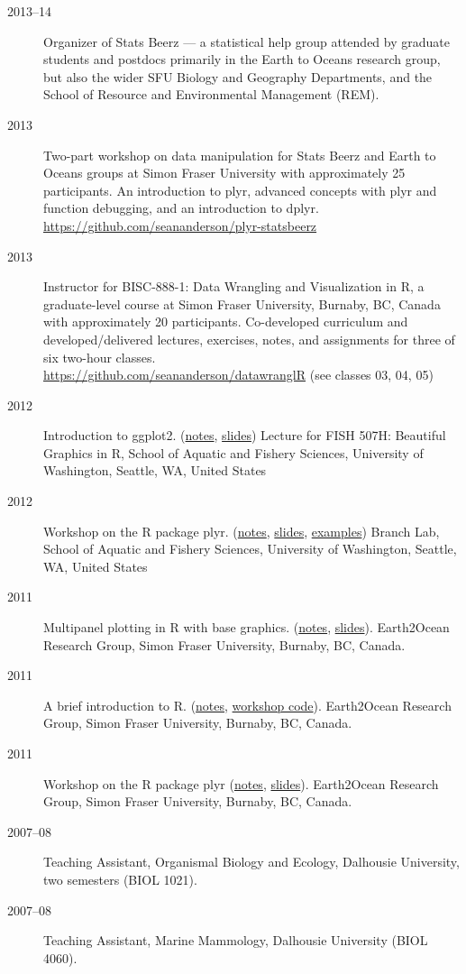 \begin{description}
\item[2013--14]
Organizer of Stats Beerz --- a statistical help group attended by
graduate students and postdocs primarily in the Earth to Oceans research
group, but also the wider SFU Biology and Geography Departments, and the
School of Resource and Environmental Management (REM).
\item[2013]
Two-part workshop on data manipulation for Stats Beerz and Earth to
Oceans groups at Simon Fraser University with approximately 25
participants. An introduction to plyr, advanced concepts with plyr and
function debugging, and an introduction to dplyr.\\
\url{https://github.com/seananderson/plyr-statsbeerz}
\item[2013]
Instructor for BISC-888-1: Data Wrangling and Visualization in R, a
graduate-level course at Simon Fraser University, Burnaby, BC, Canada
with approximately 20 participants. Co-developed curriculum and
developed/delivered lectures, exercises, notes, and assignments for
three of six two-hour classes.\\
\url{https://github.com/seananderson/datawranglR} (see classes 03, 04,
05)
\item[2012]
Introduction to ggplot2.
(\href{http://seananderson.ca/courses/12-ggplot2/ggplot2_notes.pdf}{notes},
\href{http://seananderson.ca/courses/12-ggplot2/ggplot2_slides_with_examples.pdf}{slides})
Lecture for FISH 507H: Beautiful Graphics in R, School of Aquatic and
Fishery Sciences, University of Washington, Seattle, WA, United States
\item[2012]
Workshop on the R package plyr.
(\href{http://seananderson.ca/courses/12-plyr/plyr_2012.pdf}{notes},
\href{http://seananderson.ca/courses/12-plyr/plyr_2012_slides.pdf}{slides},
\href{http://seananderson.ca/courses/12-plyr/plyr_2012_examples.html}{examples})
Branch Lab, School of Aquatic and Fishery Sciences, University of
Washington, Seattle, WA, United States
\item[2011]
Multipanel plotting in R with base graphics.
(\href{http://seananderson.ca/courses/11-multipanel/multipanel.pdf}{notes},
\href{http://seananderson.ca/courses/11-multipanel/multipanel-slides.pdf}{slides}).
Earth2Ocean Research Group, Simon Fraser University, Burnaby, BC,
Canada.
\item[2011]
A brief introduction to R.
(\href{http://seananderson.ca/courses/11-rintro/RIntro.pdf}{notes},
\href{http://seananderson.ca/courses/11-rintro/RIntro.R}{workshop
code}). Earth2Ocean Research Group, Simon Fraser University, Burnaby,
BC, Canada.
\item[2011]
Workshop on the R package plyr
(\href{http://seananderson.ca/courses/11-plyr/plyr.pdf}{notes},
\href{http://seananderson.ca/courses/11-plyr/plyr-slides.pdf}{slides}).
Earth2Ocean Research Group, Simon Fraser University, Burnaby, BC,
Canada.
\item[2007--08]
Teaching Assistant, Organismal Biology and Ecology, Dalhousie
University, two semesters (BIOL 1021).
\item[2007--08]
Teaching Assistant, Marine Mammology, Dalhousie University (BIOL 4060).
\end{description}

